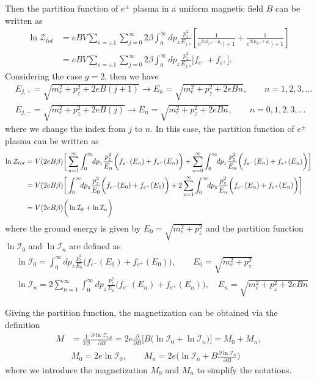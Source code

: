 \documentclass[sn-mathphys,Numbered]{sn-jnl}
\theoremstyle{thmstyleone}%
\theoremstyle{thmstyletwo}%
\theoremstyle{thmstylethree}%
\begin{document}
Then the partition function of $e^\pm$ plasma in a uniform magnetic field $B$ can be written as
\begin{align}
\ln\mathcal{Z}_{tot}&=eBV\sum_{s=\pm1}\sum_{j=0}^\infty2\beta\int_0^\infty\!\!dp_z \frac{p_z^2}{E_{j,s}}\left[\frac{1}{e^{\beta(E_{j,s}-\mu_e})+1}+\frac{1}{e^{\beta(E_{j,s}+\mu_e})+1}\right]\\
&=eBV\sum_{s=\pm1}\sum_{j=0}^\infty2\beta\int_0^\infty\!\!dp_z \frac{p_z^2}{E_{j,s}}\bigg[f_{e^-}+f_{e^+}\bigg].
\end{align}
Considering the case {\color{blue}$g=2$}, then we have
\begin{align}
 &E_{j,+}=\sqrt{{m}_e^2+p^2_z+2eB\left(j+1\right)}\longrightarrow E_{n}=\sqrt{{m}_e^2+p^2_z+2eBn},\qquad n=1,2,3,\dots\\
 &E_{j,-}=\sqrt{{m}_e^2+p^2_z+2eB\left(j\right)}\longrightarrow E_{n}=\sqrt{{m}_e^2+p^2_z+2eBn},\qquad n=0,1,2,3,\dots
\end{align}
where we change the index from $j$ to $n$. In this case, the partition function of $e^\pm$ plasma can be written as
\begin{align}
\ln\mathcal{Z}_{tot}&=V(2eB\beta) \bigg[ \sum_{n=1}^\infty\int_0^\infty\!\!dp_z \frac{p_z^2}{E_{n}}\bigg(f_{e^-}(E_n)+f_{e^+}(E_n)\bigg)+\sum_{n=0}^\infty\int_0^\infty\!\!dp_z \frac{p_z^2}{E_{n}}\bigg(f_{e^-}(E_n)+f_{e^+}(E_n)\bigg)\bigg]\notag\\
&=V(2eB\beta) \bigg[\int_0^\infty\!\!dp_z \frac{p_z^2}{E_0}\bigg(f_{e^-}(E_0)+f_{e^+}(E_0)\bigg)+2 \sum_{n=1}^\infty\int_0^\infty\!\!dp_z \frac{p_z^2}{E_{n}}\bigg(f_{e^-}(E_n)+f_{e^+}(E_n)\bigg)\bigg]\notag\\
&=V(2eB\beta)\bigg(\ln\mathcal{I}_{0}+\ln\mathcal{I}_{n}\bigg)
\end{align}
where the ground energy is given by $E_0=\sqrt{{m}_e^2+p^2_z}$ and the partition function $\ln\mathcal{I}_{0}$ and $\ln\mathcal{I}_{n}$ are defined as
\begin{align}
&\ln\mathcal{I}_{0}=\int_0^\infty\!\!dp_z \frac{p_z^2}{E_0}\bigg(f_{e^-}(E_0)+f_{e^+}(E_0)\bigg),\qquad E_0=\sqrt{{m}_e^2+p^2_z} \\
&\ln\mathcal{I}_{n}=2 \sum_{n=1}^\infty\int_0^\infty\!\!dp_z \frac{p_z^2}{E_{n}}\bigg(f_{e^-}(E_n)+f_{e^+}(E_n)\bigg),\quad E_n=\sqrt{{m}_e^2+p^2_z+2eBn}
\end{align}




Giving the partition function, the magnetization can be obtained via the definition
\begin{align}
M&=\frac{1}{V\beta}\frac{\partial \ln \mathcal{Z}_{tot}}{\partial B}=2e\frac{\partial}{\partial B}\bigg[B\bigg(\ln\mathcal{I}_{0}+\ln\mathcal{I}_{n}\bigg)\bigg]=M_0+M_n,\\
&M_0=2e\ln\mathcal{I}_{0},\qquad
M_n=2e\bigg(\ln\mathcal{I}_{n}+B\frac{\partial\ln\mathcal{I}_n}{\partial B}\bigg)
\end{align}
where we introduce the magnetization $M_0$ and $M_n$ to simplify the notations.
\end{document}
